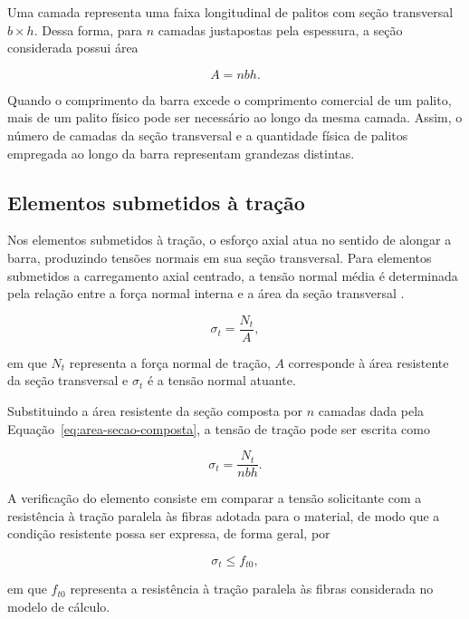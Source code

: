 Uma camada representa uma faixa longitudinal de palitos com seção transversal \(b \times h\). Dessa forma, para \(n\) camadas justapostas pela espessura, a seção considerada possui área

\begin{equation}
    A = nbh.
    \label{eq:area-secao-composta}
\end{equation}

Quando o comprimento da barra excede o comprimento comercial de um palito, mais de um palito físico pode ser necessário ao longo da mesma camada. Assim, o número de camadas da seção transversal e a quantidade física de palitos empregada ao longo da barra representam grandezas distintas.

\subsection{Elementos submetidos à tração}
\label{subsec:tracao}

Nos elementos submetidos à tração, o esforço axial atua no sentido de alongar a barra, produzindo tensões normais em sua seção transversal. Para elementos submetidos a carregamento axial centrado, a tensão normal média é determinada pela relação entre a força normal interna e a área da seção transversal \cite{hibbeler2018resistencia}.

\begin{equation}
\sigma_t = \frac{N_t}{A},
\end{equation}

em que \(N_t\) representa a força normal de tração, \(A\) corresponde à área resistente da seção transversal e \(\sigma_t\) é a tensão normal atuante.

Substituindo a área resistente da seção composta por \(n\) camadas dada pela Equação~\ref{eq:area-secao-composta}, a tensão de tração pode ser escrita como

\begin{equation}
\sigma_t = \frac{N_t}{nbh}.
\end{equation}

A verificação do elemento consiste em comparar a tensão solicitante com a resistência à tração paralela às fibras adotada para o material, de modo que a condição resistente possa ser expressa, de forma geral, por

\begin{equation}
\sigma_t \leq f_{t0},
\end{equation}

em que \(f_{t0}\) representa a resistência à tração paralela às fibras considerada no modelo de cálculo.

